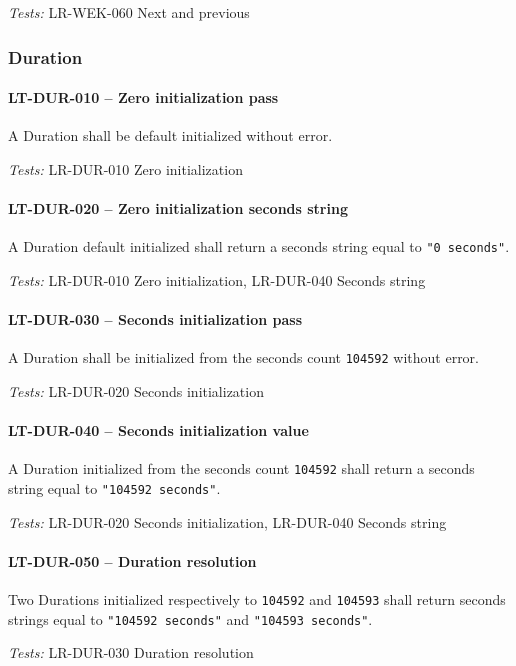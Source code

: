 \textit{Tests: } LR-WEK-060 Next and previous

\subsubsection{Duration}
\paragraph{LT-DUR-010 -- Zero initialization pass}
A Duration shall be default initialized without error.

\textit{Tests: } LR-DUR-010 Zero initialization

\paragraph{LT-DUR-020 -- Zero initialization seconds string}
A Duration default initialized shall return a seconds string
equal to \lstinline{"0 seconds"}.

\textit{Tests: } LR-DUR-010 Zero initialization, LR-DUR-040 Seconds string

\paragraph{LT-DUR-030 -- Seconds initialization pass}
A Duration shall be initialized from the seconds count \lstinline{104592}
without error.

\textit{Tests: } LR-DUR-020 Seconds initialization

\paragraph{LT-DUR-040 -- Seconds initialization value}
A Duration initialized from the seconds count \lstinline{104592}
shall return a seconds string equal to \lstinline{"104592 seconds"}.

\textit{Tests: } LR-DUR-020 Seconds initialization, LR-DUR-040 Seconds string

\paragraph{LT-DUR-050 -- Duration resolution}
Two Durations initialized respectively to \lstinline{104592} and
\lstinline{104593} shall return seconds strings equal to
\lstinline{"104592 seconds"} and \lstinline{"104593 seconds"}.

\textit{Tests: } LR-DUR-030 Duration resolution

